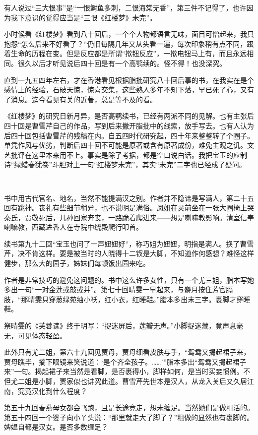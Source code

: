 \par 有人说过“三大恨事”是“一恨鲥鱼多刺，二恨海棠无香”，第三件不记得了，也许因为我下意识的觉得应当是“三恨《红楼梦》未完”。
\par 小时候看《红楼梦》看到八十回后，一个个人物都语言无味，面目可憎起来，我只抱怨“怎么后来不好看了？”仍旧每隔几年又从头看一遍，每次印象稍有点不同，跟着生命的历程在变。但是反应都是所谓“揿钮反应”，一揿电钮马上有，而且永远相同。很久以后才听见说后四十回是有一个高鹗续的。怪不得！也没深究。
\par 直到一九五四年左右，才在香港看见根据脂批研究八十回后事的书，在我实在是个感情上的经验，石破天惊，惊喜交集，这些熟人多年不知下落，早已死了心，又有了消息。迄今看见有关的近著，总是等不及的看。
\par 《红楼梦》的研究日新月异，是否高鹗续书，已经有两派不同的见解。也有主张后四十回是曹雪芹自己的作品，写到后来撇开脂批中的线索，放手写去。也有人认为后四十回包括曹雪芹的残稿在内。自五四时代研究起，四十年来整整转了个圈子。单凭作风与优劣，判断后四十回不可能是原著或含有原著成份，难免主观之讥。文艺批评在这里本来用不上。事实是除了考据，都是空口说白话。我把宝玉的应制诗“绿蜡春犹卷”斗胆对上一句“红楼梦未完”，其实“未完”二字也已经成了疑问。
\par  
\par 书中用古代官名、地名，当然不能提满汉之别。作者并不隐讳是写满人，第二十五回有跳神。丧礼有些细节稍异，也不说明是满俗。凤姐在灵前坐在一张大圈椅上哭秦氏，贾敬死后，儿孙回家奔丧，一路跪着爬进来——想是喇嘛教影响。清室信奉喇嘛教，西藏进香人在寺院中绕殿爬行叩首。
\par 续书第九十二回“宝玉也问了一声妞妞好”，称巧姐为妞妞，明指是满人。换了曹雪芹，决不肯这样。要是被当时的人晓得十二钗是大脚，不知道作何感想？难怪这样健步，那么大的园子，姊妹们每顿饭出园来吃。
\par 作者是非常技巧的避免这问题的。书中这么许多女性，只有一个尤三姐，脂本写她多出一句“一对金莲或敲或并”。第七十回晴雯一早起来，与麝月按住芳官膈肢，“那晴雯只穿葱绿苑䌷小袄，红小衣，红睡鞋。”脂本多出末三字。裹脚才穿睡鞋。
\par 祭晴雯的《芙蓉诔》终于明写：“捉迷屏后，莲瓣无声。”小脚捉迷藏，竟声息毫无，可见体态轻盈。
\par 此外只有尤二姐，第六十九回见贾母，贾母细看皮肤与手，“鸳鸯又揭起裙子来，贾母瞧毕，摘下眼镜来笑说道：‘是个齐全孩子。……'”脂本多出“鸳鸯又揭起裙子来”一句。揭起裙子来当然是看脚，是否裹得小，脚样如何，是当时买妾惯例。不但尤二姐是小脚，贾家似也讲究此道。曹雪芹先世本是汉人，从龙入关后又久居江南，究竟汉化到什么程度？
\par 第五十九回春燕母女都会飞跑，且是长途竞走，想未缠足。当然她们是做粗活的。第五十四回一个婆子向小丫头说：“那里就走大了脚了？”粗做的显然也有裹脚的。婢媪自都是汉女。是否多数缠足？
